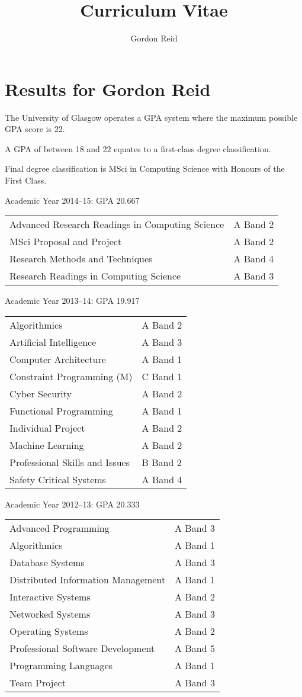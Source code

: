 \documentclass[10pt,a4paper]{article}
\title{Curriculum Vitae}
\author{Gordon Reid}
\begin{document}
\section*{Results for Gordon Reid}
The University of Glasgow operates a GPA system where the maximum possible GPA
score is 22.

A GPA of between 18 and 22 equates to a first-class degree classification.

Final degree classification is MSci in Computing Science with Honours of the
First Class.

Academic Year 2014--15: GPA 20.667

\begin{tabular}{p{10cm}l}
    Advanced Research Readings in Computing Science & A Band 2\\
    MSci Proposal and Project & A Band 2\\
    Research Methods and Techniques & A Band 4\\
    Research Readings in Computing Science & A Band 3\\
\end{tabular}

Academic Year 2013--14: GPA 19.917

\begin{tabular}{p{10cm}l}
    Algorithmics & A Band 2\\
    Artificial Intelligence & A Band 3\\
    Computer Architecture & A Band 1\\
    Constraint Programming (M) & C Band 1\\
    Cyber Security & A Band 2\\
    Functional Programming & A Band 1\\
    Individual Project & A Band 2\\
    Machine Learning & A Band 2\\
    Professional Skills and Issues & B Band 2\\
    Safety Critical Systems & A Band 4\\
\end{tabular}

Academic Year 2012--13: GPA 20.333

\begin{tabular}{p{10cm}l}
    Advanced Programming & A Band 3\\
    Algorithmics & A Band 1\\
    Database Systems & A Band 3\\
    Distributed Information Management & A Band 1\\
    Interactive Systems & A Band 2\\
    Networked Systems & A Band 3\\
    Operating Systems & A Band 2\\
    Professional Software Development & A Band 5\\
    Programming Languages & A Band 1\\
    Team Project & A Band 3\\
\end{tabular}
\end{document}
